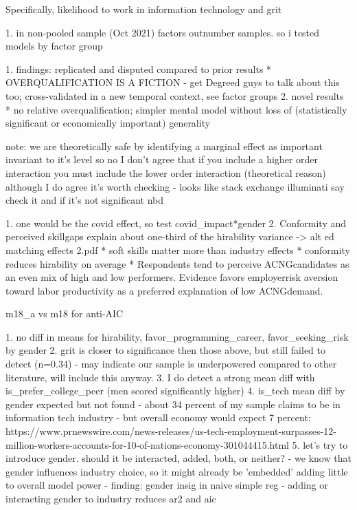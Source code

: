\documentclass[review]{elsarticle}
\begin{document}
Specifically, likelihood to work in information technology and grit



1. in non-pooled sample (Oct 2021) factors outnumber samples. so i tested models by factor group


1. findings: replicated and disputed compared to prior results
    * OVERQUALIFICATION IS A FICTION - get Degreed guys to talk about this too; cross-validated in a new temporal context, see factor groups
2. novel results
    * no relative overqualification; simpler mental model without loss of (statistically significant or economically important) generality

note: we are theoretically safe by identifying a marginal effect as important invariant to it's level
    so no I don't agree that if you include a higher order interaction you must include the lower order interaction (theoretical reason)
    although I do agree it's worth checking - looks like stack exchange illuminati say check it and if it's not significant nbd

1. one would be the covid effect, so test covid_impact*gender
2.  Conformity  and  perceived  skillgaps  explain  about  one-third  of  the  hirability  variance -> alt ed matching effects 2.pdf
    * soft skills matter more than industry effects
    * conformity reduces hirability on average
    * Respondents tend to perceive ACNGcandidates as an even mix of high and low performers.  Evidence favors employerrisk aversion toward labor productivity as a preferred explanation of low ACNGdemand.

m18_a vs m18 for anti-AIC


1. no diff in means for hirability, favor_programming_career, favor_seeking_risk by gender
2. grit is closer to significance then those above, but still failed to detect (n=0.34)
    - may indicate our sample is underpowered compared to other literature, will include this anyway.
3. I do detect a strong mean diff with is_prefer_college_peer (men scored significantly higher)
4. is_tech mean diff by gender expected but not found
    - about 34 percent of my sample claims to be in information tech industry
    - but overall economy would expect 7 percent: https://www.prnewswire.com/news-releases/us-tech-employment-surpasses-12-million-workers-accounts-for-10-of-nations-economy-301044415.html
5. let's try to introduce gender. should it be interacted, added, both, or neither?
    - we know that gender influences industry choice, so it might already be 'embedded' adding little to overall model power
    - finding: gender insig in naive simple reg
    - adding or interacting gender to industry reduces ar2 and aic
\end{document}
